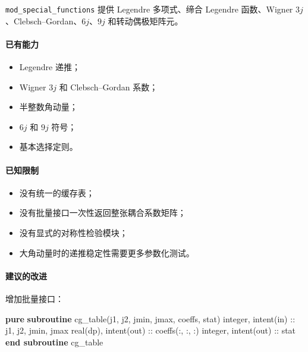 \documentclass[
]{ctexbook}
\newenvironment{Shaded}{}{}
\newcommand{\DataTypeTok}[1]{\textcolor[rgb]{0.56,0.13,0.00}{#1}}
\newcommand{\KeywordTok}[1]{\textcolor[rgb]{0.00,0.44,0.13}{\textbf{#1}}}
\newcommand{\NormalTok}[1]{#1}
\providecommand{\tightlist}{%
  \setlength{\itemsep}{0pt}\setlength{\parskip}{0pt}}
\begin{document}
\texttt{mod\_special\_functions} 提供 Legendre 多项式、缔合 Legendre
函数、Wigner \(3j\)、Clebsch--Gordan、\(6j\)、\(9j\) 和转动偶极矩阵元。

\hypertarget{ux5df2ux6709ux80fdux529b-1}{%
\paragraph{已有能力}\label{ux5df2ux6709ux80fdux529b-1}}

\begin{itemize}
\tightlist
\item
  Legendre 递推；
\item
  Wigner \(3j\) 和 Clebsch--Gordan 系数；
\item
  半整数角动量；
\item
  \(6j\) 和 \(9j\) 符号；
\item
  基本选择定则。
\end{itemize}

\hypertarget{ux5df2ux77e5ux9650ux5236-1}{%
\paragraph{已知限制}\label{ux5df2ux77e5ux9650ux5236-1}}

\begin{itemize}
\tightlist
\item
  没有统一的缓存表；
\item
  没有批量接口一次性返回整张耦合系数矩阵；
\item
  没有显式的对称性检验模块；
\item
  大角动量时的递推稳定性需要更多参数化测试。
\end{itemize}

\hypertarget{ux5efaux8baeux7684ux6539ux8fdb-1}{%
\paragraph{建议的改进}\label{ux5efaux8baeux7684ux6539ux8fdb-1}}

增加批量接口：

\begin{Shaded}
\begin{Highlighting}[]
\KeywordTok{pure} \KeywordTok{subroutine}\NormalTok{ cg\_table(j1, j2, jmin, jmax, coeffs, stat)}
    \DataTypeTok{integer}\NormalTok{, }\DataTypeTok{intent(in)} \DataTypeTok{::}\NormalTok{ j1, j2, jmin, jmax}
\DataTypeTok{    real(dp)}\NormalTok{, }\DataTypeTok{intent(out)} \DataTypeTok{::}\NormalTok{ coeffs(:, :, :)}
    \DataTypeTok{integer}\NormalTok{, }\DataTypeTok{intent(out)} \DataTypeTok{::}\NormalTok{ stat}
\KeywordTok{end subroutine}\NormalTok{ cg\_table}
\end{Highlighting}
\end{Shaded}
\end{document}
